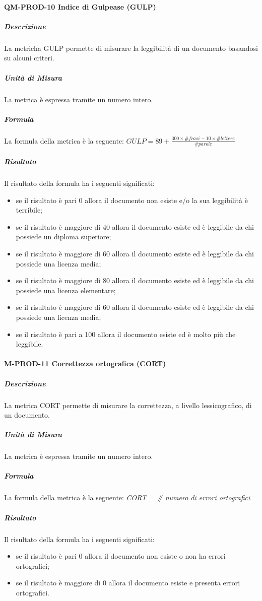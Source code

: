 		\paragraph{QM-PROD-10 Indice di Gulpease (GULP)}
			\subparagraph{Descrizione}
				La metricha GULP permette di misurare la leggibilità di un documento basandosi su alcuni criteri.
			\subparagraph{Unità di Misura}
				La metrica è espressa tramite un numero intero.
			\subparagraph{Formula}
				La formula della metrica è la seguente:
				\(
					GULP = 89+\frac{300\times\# frasi-10\times\#lettere}{\#parole}
				\)
			\subparagraph{Risultato}
				Il risultato della formula ha i seguenti significati:
				\begin{itemize}
					\item se il risultato è pari 0 allora il documento non esiste e/o la sua leggibilità è terribile;
					\item se il risultato è maggiore di 40 allora il documento esiste ed è leggibile da chi possiede un diploma superiore;
					\item se il risultato è maggiore di 60 allora il documento esiste ed è leggibile da chi possiede una licenza media;
					\item se il risultato è maggiore di 80 allora il documento esiste ed è leggibile da chi possiede una licenza elementare;
					\item se il risultato è maggiore di 60 allora il documento esiste ed è leggibile da chi possiede una licenza media;
					\item se il risultato è pari a 100 allora il documento esiste ed è molto più che leggibile.
				\end{itemize}
		\paragraph{M-PROD-11 Correttezza ortografica (CORT)}
			\subparagraph{Descrizione}
			La metrica CORT permette di misurare la correttezza, a livello lessicografico, di un documento.
			\subparagraph{Unità di Misura}
				La metrica è espressa tramite un numero intero.
			\subparagraph{Formula}
				La formula della metrica è la seguente:
				\textit{CORT = \# numero di errori ortografici}
			\subparagraph{Risultato}
				Il risultato della formula ha i seguenti significati:
				\begin{itemize}
					\item se il risultato è pari 0 allora il documento non esiste o non ha errori ortografici;
					\item se il risultato è maggiore di 0 allora il documento esiste e presenta errori ortografici.
				\end{itemize}

